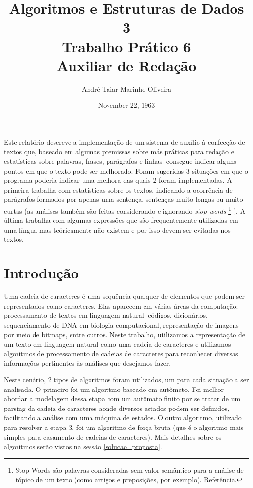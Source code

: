 \documentclass[12pt]{article}
\title{Algoritmos e Estruturas de Dados 3 \\ Trabalho Prático 6 \\
\huge{Auxiliar de Redação}}
\date{November 22, 1963}
\author{André Taiar Marinho Oliveira}
\begin{document}
\maketitle

\begin{resumo}
\label{resumo}
Este relatório descreve a implementação de um sistema de auxílio à confecção de textos que, baseado em algumas premissas sobre más práticas para redação e estatísticas sobre palavras, frases, parágrafos e linhas, consegue indicar alguns pontos em que o texto pode ser melhorado. Foram sugeridas 3 situações em que o programa poderia indicar uma melhora das quais 2 foram implementadas. A primeira trabalha com estatísticas sobre os textos, indicando a ocorrência de parágrafos formados por apenas uma sentença, sentenças muito longas ou muito curtas (as análises também são feitas considerando e ignorando \textit{stop words} \footnote{Stop Words são palavras consideradas sem valor semântico para a análise de tópico de um texto (como artigos e preposições, por exemplo). \href{http://searchenginewatch.com/2156061}{Referência}.} ). A última trabalha com algumas expressões que são frequentemente utilizadas em uma língua mas teóricamente não existem e por isso devem ser evitadas nos textos.
\end{resumo}

\section{Introdução}
\label{introducao}

Uma cadeia de caracteres é uma sequência qualquer de elementos que podem ser representados como caracteres. Elas aparecem em várias áreas da computação: processamento de textos em linguagem natural, códigos, dicionários, sequenciamento de DNA em biologia computacional, representação de imagens por meio de bitmaps, entre outros. Neste trabalho, utilizamos a representação de um texto em linguagem natural como uma cadeia de caracteres e utilizamos algoritmos de processamento de cadeias de caracteres para reconhecer diversas informações pertinentes às análises que desejamos fazer.

Neste cenário, 2 tipos de algoritmos foram utilizados, um para cada situação a ser analisada. O primeiro foi um algoritmo baseado em autômato. Foi melhor abordar a modelagem dessa etapa com um autômato finito por se tratar de um parsing da cadeia de caracteres aonde diversos estados podem ser definidos, facilitando a análise com uma máquina de estados. O outro algoritmo, utilizado para resolver a etapa 3, foi um algoritmo de força bruta (que é o algoritmo mais simples para casamento de cadeias de caracteres). Mais detalhes sobre os algoritmos serão vistos na sessão \ref{solucao_proposta}.
\end{document}
